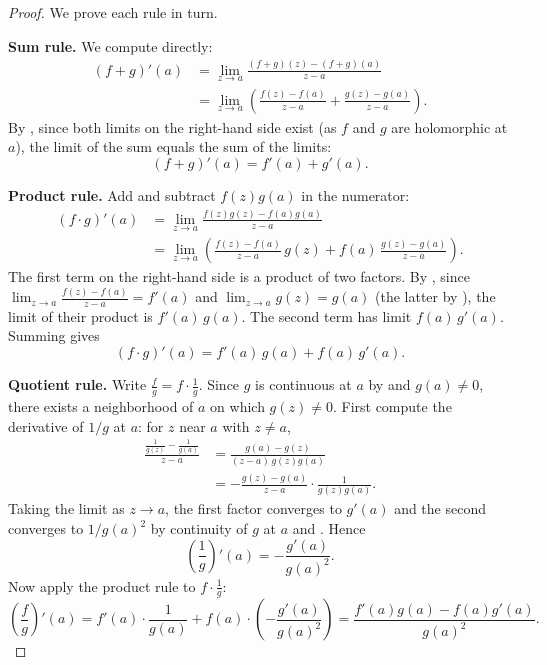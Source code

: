 \begin{proof}
    We prove each rule in turn.

    \textbf{Sum rule.} We compute directly:
    \begin{align*}
        (f + g)'(a) &= \lim_{z \to a} \frac{(f+g)(z) - (f+g)(a)}{z - a} \\
        &= \lim_{z \to a} \left( \frac{f(z) - f(a)}{z - a} + \frac{g(z) - g(a)}{z - a} \right).
    \end{align*}
    By , since both limits on the right-hand side exist (as $f$ and $g$ are holomorphic at $a$), the limit of the sum equals the sum of the limits:
    $$(f + g)'(a) = f'(a) + g'(a).$$

    \textbf{Product rule.} Add and subtract $f(z)g(a)$ in the numerator:
    \begin{align*}
        (f \cdot g)'(a) &= \lim_{z \to a} \frac{f(z)g(z) - f(a)g(a)}{z - a} \\
        &= \lim_{z \to a} \left( \frac{f(z) - f(a)}{z - a}\,g(z) + f(a)\,\frac{g(z) - g(a)}{z - a} \right).
    \end{align*}
    The first term on the right-hand side is a product of two factors. By , since $\displaystyle\lim_{z \to a} \frac{f(z) - f(a)}{z - a} = f'(a)$ and $\displaystyle\lim_{z \to a} g(z) = g(a)$ (the latter by ), the limit of their product is $f'(a)\,g(a)$. The second term has limit $f(a)\,g'(a)$. Summing gives
    $$(f \cdot g)'(a) = f'(a)\,g(a) + f(a)\,g'(a).$$

    \textbf{Quotient rule.} Write $\frac{f}{g} = f \cdot \frac{1}{g}$. Since $g$ is continuous at $a$ by  and $g(a) \neq 0$, there exists a neighborhood of $a$ on which $g(z) \neq 0$. First compute the derivative of $1/g$ at $a$: for $z$ near $a$ with $z \neq a$,
    \begin{align*}
        \frac{\frac{1}{g(z)} - \frac{1}{g(a)}}{z - a} &= \frac{g(a) - g(z)}{(z - a)\,g(z)g(a)} \\
        &= -\frac{g(z) - g(a)}{z - a} \cdot \frac{1}{g(z)g(a)}.
    \end{align*}
    Taking the limit as $z \to a$, the first factor converges to $g'(a)$ and the second converges to $1/g(a)^2$ by continuity of $g$ at $a$ and . Hence
    $$\left(\frac{1}{g}\right)'(a) = -\frac{g'(a)}{g(a)^2}.$$
    Now apply the product rule to $f \cdot \frac{1}{g}$:
    $$\left(\frac{f}{g}\right)'(a) = f'(a)\cdot\frac{1}{g(a)} + f(a)\cdot\left(-\frac{g'(a)}{g(a)^2}\right) = \frac{f'(a)g(a) - f(a)g'(a)}{g(a)^2}.$$


\end{proof}
